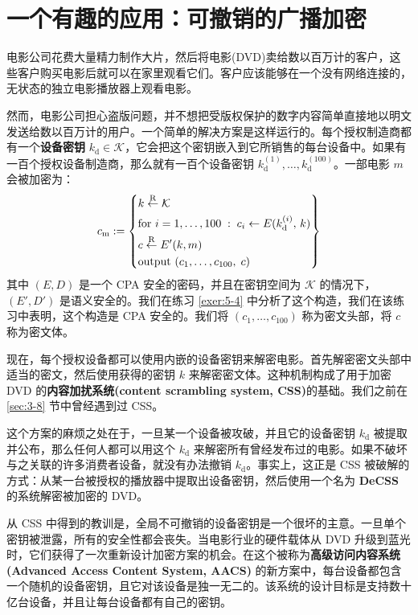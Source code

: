 \section{一个有趣的应用：可撤销的广播加密}

电影公司花费大量精力制作大片，然后将电影(DVD)卖给数以百万计的客户，这些客户购买电影后就可以在家里观看它们。客户应该能够在一个没有网络连接的，无状态的独立电影播放器上观看电影。

然而，电影公司担心盗版问题，并不想把受版权保护的数字内容简单直接地以明文发送给数以百万计的用户。一个简单的解决方案是这样运行的。每个授权制造商都有一个\textbf{设备密钥} $k_\mathrm{d}\in\mathcal{K}$，它会把这个密钥嵌入到它所销售的每台设备中。如果有一百个授权设备制造商，那么就有一百个设备密钥 $k^{(1)}_\mathrm{d}, \dots, k^{(100)}_\mathrm{d}$。一部电影 $m$ 会被加密为：
\[
c_\mathrm{m}:=
\left\{
\begin{aligned}
& k\overset{\rm R}\leftarrow\mathcal{K}\\
& \text{for } i=1,\dots,100\;:\; c_i\leftarrow E(k^{(i)}_\mathrm{d},\,k)\\
& c\overset{\rm R}\leftarrow E'(k,m)\\
& \text{output } (c_1,\dots,c_{100},\;c)
\end{aligned}
\right\}
\]
其中 $(E,D)$ 是一个 CPA 安全的密码，并且在密钥空间为 $\mathcal{K}$ 的情况下，$(E',D')$ 是语义安全的。我们在练习 \ref{exer:5-4} 中分析了这个构造，我们在该练习中表明，这个构造是 CPA 安全的。我们将 $(c_1, \dots, c_{100})$ 称为密文头部，将 $c$ 称为密文体。

现在，每个授权设备都可以使用内嵌的设备密钥来解密电影。首先解密密文头部中适当的密文，然后使用获得的密钥 $k$ 来解密密文体。这种机制构成了用于加密 DVD 的\textbf{内容加扰系统(content scrambling system, CSS)}的基础。我们之前在 \ref{sec:3-8} 节中曾经遇到过 CSS。

这个方案的麻烦之处在于，一旦某一个设备被攻破，并且它的设备密钥 $k_\mathrm{d}$ 被提取并公布，那么任何人都可以用这个 $k_\mathrm{d}$ 来解密所有曾经发布过的电影。如果不破坏与之关联的许多消费者设备，就没有办法撤销 $k_\mathrm{d}$。事实上，这正是 CSS 被破解的方式：从某一台被授权的播放器中提取出设备密钥，然后使用一个名为 \textbf{DeCSS} 的系统解密被加密的 DVD。

从 CSS 中得到的教训是，全局不可撤销的设备密钥是一个很坏的主意。一旦单个密钥被泄露，所有的安全性都会丧失。当电影行业的硬件载体从 DVD 升级到蓝光时，它们获得了一次重新设计加密方案的机会。在这个被称为\textbf{高级访问内容系统 (Advanced Access Content System, AACS)} 的新方案中，每台设备都包含一个随机的设备密钥，且它对该设备是独一无二的。该系统的设计目标是支持数十亿台设备，并且让每台设备都有自己的密钥。

